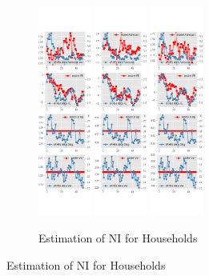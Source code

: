 \documentclass[]{article}
\begin{document}
\begin{figure}[htbp]
	\centering
	\begin{subfigure}[b]{\textwidth}
		\centering
		\caption{Estimation of NI  for Households}
		\label{NI_diag_SCE}
		\includegraphics[width=0.19\textwidth]{figures/sce_ni_est_diag0.png}
		\includegraphics[width=0.19\textwidth]{figures/sce_ni_est_diag1.png}
		\includegraphics[width=0.19\textwidth]{figures/sce_ni_est_diag2.png}

\end{subfigure}
\end{figure}
\end{document}
